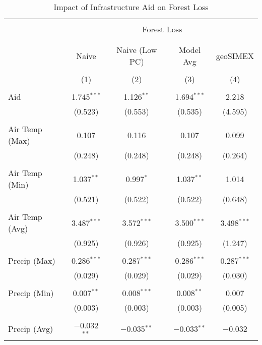 
\begin{table}[!htbp] \centering 
  \caption{Impact of Infrastructure Aid on Forest Loss} 
  \label{seresults} 
\begin{tabular}{@{\extracolsep{5pt}}lcccc} 
\\[-1.8ex]\hline 
\hline \\[-1.8ex] 
 & \multicolumn{4}{c}{Forest Loss} \\ 
\cline{2-5} 
\\[-1.8ex] & \multicolumn{4}{c}{} \\ 
 & Naive & Naive (Low PC) & Model Avg & geoSIMEX \\ 
\\[-1.8ex] & (1) & (2) & (3) & (4)\\ 
\hline \\[-1.8ex] 
 Aid & 1.745$^{***}$ & 1.126$^{**}$ & 1.694$^{***}$ & 2.218 \\ 
  & (0.523) & (0.553) & (0.535) & (4.595) \\ 
  & & & & \\ 
 Air Temp (Max) & 0.107 & 0.116 & 0.107 & 0.099 \\ 
  & (0.248) & (0.248) & (0.248) & (0.264) \\ 
  & & & & \\ 
 Air Temp (Min) & 1.037$^{**}$ & 0.997$^{*}$ & 1.037$^{**}$ & 1.014 \\ 
  & (0.521) & (0.522) & (0.522) & (0.648) \\ 
  & & & & \\ 
 Air Temp (Avg) & 3.487$^{***}$ & 3.572$^{***}$ & 3.500$^{***}$ & 3.498$^{***}$ \\ 
  & (0.925) & (0.926) & (0.925) & (1.247) \\ 
  & & & & \\ 
 Precip (Max) & 0.286$^{***}$ & 0.287$^{***}$ & 0.286$^{***}$ & 0.287$^{***}$ \\ 
  & (0.029) & (0.029) & (0.029) & (0.030) \\ 
  & & & & \\ 
 Precip  (Min) & 0.007$^{**}$ & 0.008$^{***}$ & 0.008$^{**}$ & 0.007 \\ 
  & (0.003) & (0.003) & (0.003) & (0.005) \\ 
  & & & & \\ 
 Precip  (Avg) & $-$0.032$^{**}$ & $-$0.035$^{**}$ & $-$0.033$^{**}$ & $-$0.032 \\ 

\end{tabular}
\end{table}
